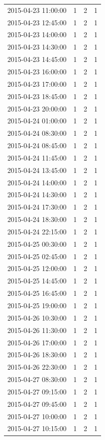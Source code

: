 \begin{tabular}{lrrr}
2015-04-23 11:00:00 & 1 & 2 & 1 \\
2015-04-23 12:45:00 & 1 & 2 & 1 \\
2015-04-23 14:00:00 & 1 & 2 & 1 \\
2015-04-23 14:30:00 & 1 & 2 & 1 \\
2015-04-23 14:45:00 & 1 & 2 & 1 \\
2015-04-23 16:00:00 & 1 & 2 & 1 \\
2015-04-23 17:00:00 & 1 & 2 & 1 \\
2015-04-23 18:45:00 & 1 & 2 & 1 \\
2015-04-23 20:00:00 & 1 & 2 & 1 \\
2015-04-24 01:00:00 & 1 & 2 & 1 \\
2015-04-24 08:30:00 & 1 & 2 & 1 \\
2015-04-24 08:45:00 & 1 & 2 & 1 \\
2015-04-24 11:45:00 & 1 & 2 & 1 \\
2015-04-24 13:45:00 & 1 & 2 & 1 \\
2015-04-24 14:00:00 & 1 & 2 & 1 \\
2015-04-24 14:30:00 & 1 & 2 & 1 \\
2015-04-24 17:30:00 & 1 & 2 & 1 \\
2015-04-24 18:30:00 & 1 & 2 & 1 \\
2015-04-24 22:15:00 & 1 & 2 & 1 \\
2015-04-25 00:30:00 & 1 & 2 & 1 \\
2015-04-25 02:45:00 & 1 & 2 & 1 \\
2015-04-25 12:00:00 & 1 & 2 & 1 \\
2015-04-25 14:45:00 & 1 & 2 & 1 \\
2015-04-25 16:45:00 & 1 & 2 & 1 \\
2015-04-25 19:00:00 & 1 & 2 & 1 \\
2015-04-26 10:30:00 & 1 & 2 & 1 \\
2015-04-26 11:30:00 & 1 & 2 & 1 \\
2015-04-26 17:00:00 & 1 & 2 & 1 \\
2015-04-26 18:30:00 & 1 & 2 & 1 \\
2015-04-26 22:30:00 & 1 & 2 & 1 \\
2015-04-27 08:30:00 & 1 & 2 & 1 \\
2015-04-27 09:15:00 & 1 & 2 & 1 \\
2015-04-27 09:45:00 & 1 & 2 & 1 \\
2015-04-27 10:00:00 & 1 & 2 & 1 \\
2015-04-27 10:15:00 & 1 & 2 & 1 \\

\end{tabular}
